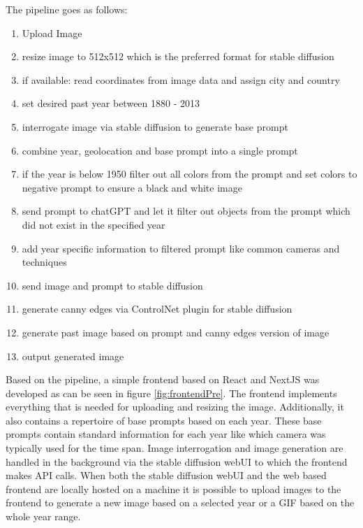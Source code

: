 \documentclass[english,notitlepage,smartquotes]{hgbreport}
\begin{document}
The pipeline goes as follows:
\label{pipelineDesc}
\begin{enumerate}
    \item Upload Image
    \item resize image to 512x512 which is the preferred format for stable diffusion
    \item if available: read coordinates from image data and assign city and country
    \item set desired past year between 1880 - 2013
    \item interrogate image via stable diffusion to generate base prompt
    \item combine year, geolocation and base prompt into a single prompt
    \item if the year is below 1950 filter out all colors from the prompt and set colors to negative prompt to ensure a black and white image
    \item send prompt to chatGPT and let it filter out objects from the prompt which did not exist in the specified year
    \item add year specific information to filtered prompt like common cameras and techniques
    \item send image and prompt to stable diffusion 
    \item generate canny edges via ControlNet plugin for stable diffusion
    \item generate past image based on prompt and canny edges version of image
    \item output generated image
\end{enumerate}

Based on the pipeline, a simple frontend based on React and NextJS was developed as can be seen in figure \ref{fig:frontendPre}. The frontend implements everything that is needed for uploading and resizing the image. Additionally, it also contains a repertoire of base prompts based on each year. These base prompts contain standard information for each year like which camera was typically used for the time span. Image interrogation and image generation are handled in the background via the stable diffusion webUI to which the frontend makes API calls.
When both the stable diffusion webUI and the web based frontend are locally hosted on a machine it is possible to upload images to the frontend to generate a new image based on a selected year or a GIF based on the whole year range.
\end{document}
